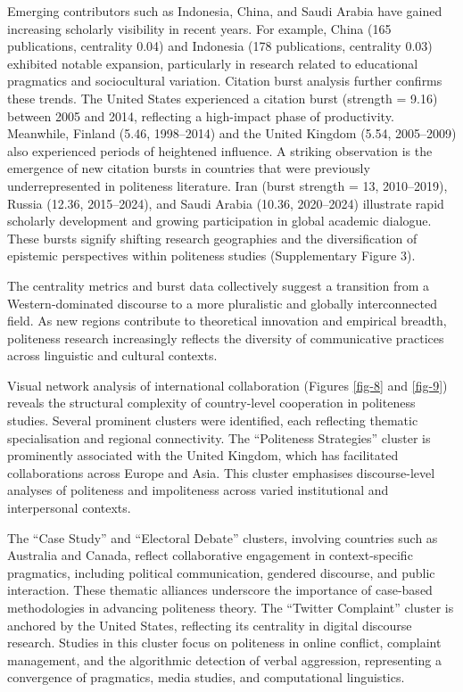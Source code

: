 \documentclass[english]{textolivre}
\begin{document}
Emerging contributors such as Indonesia, China, and Saudi Arabia have gained increasing scholarly visibility in recent years. For example, China (165 publications, centrality 0.04) and Indonesia (178 publications, centrality 0.03) exhibited notable expansion, particularly in research related to educational pragmatics and sociocultural variation. Citation burst analysis further confirms these trends. The United States experienced a citation burst (strength = 9.16) between 2005 and 2014, reflecting a high-impact phase of productivity. Meanwhile, Finland (5.46, 1998–2014) and the United Kingdom (5.54, 2005–2009) also experienced periods of heightened influence.
\newpage
A striking observation is the emergence of new citation bursts in countries that were previously underrepresented in politeness literature. Iran (burst strength = 13, 2010–2019), Russia (12.36, 2015–2024), and Saudi Arabia (10.36, 2020–2024) illustrate rapid scholarly development and growing participation in global academic dialogue. These bursts signify shifting research geographies and the diversification of epistemic perspectives within politeness studies (Supplementary Figure 3).

The centrality metrics and burst data collectively suggest a transition from a Western-dominated discourse to a more pluralistic and globally interconnected field. As new regions contribute to theoretical innovation and empirical breadth, politeness research increasingly reflects the diversity of communicative practices across linguistic and cultural contexts.

Visual network analysis of international collaboration (Figures \ref{fig-8} and \ref{fig-9}) reveals the structural complexity of country-level cooperation in politeness studies. Several prominent clusters were identified, each reflecting thematic specialisation and regional connectivity. The ``Politeness Strategies'' cluster is prominently associated with the United Kingdom, which has facilitated collaborations across Europe and Asia. This cluster emphasises discourse-level analyses of politeness and impoliteness across varied institutional and interpersonal contexts.

The ``Case Study'' and ``Electoral Debate'' clusters, involving countries such as Australia and Canada, reflect collaborative engagement in context-specific pragmatics, including political communication, gendered discourse, and public interaction. These thematic alliances underscore the importance of case-based methodologies in advancing politeness theory. The ``Twitter Complaint'' cluster is anchored by the United States, reflecting its centrality in digital discourse research. Studies in this cluster focus on politeness in online conflict, complaint management, and the algorithmic detection of verbal aggression, representing a convergence of pragmatics, media studies, and computational linguistics.
\end{document}
